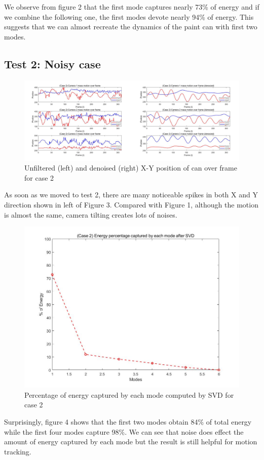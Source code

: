 \documentclass[11pt,a4paper]{article}
\numberwithin{equation}{subsection}
\begin{document}
We observe from figure 2 that the first mode captures nearly 73\% of energy and if we combine the following one, the first modes devote nearly 94\% of energy. This suggests that we can almost recreate the dynamics of the paint can with first two modes.

\subsection{Test 2: Noisy case}
\begin{figure}[H]
\begin{center}
\includegraphics[scale=0.20]{f3.jpg}
\caption{Unfiltered (left) and denoised (right) X-Y position of can over frame for case 2}
\end{center}
\end{figure}
As soon as we moved to test 2, there are many noticeable spikes in both X and Y direction shown in left of Figure 3. Compared with Figure 1, although the motion is almost the same, camera tilting creates lots of noises.
\begin{figure}[H]
\begin{center}
\includegraphics[scale=0.20]{f4.jpg}
\caption{Percentage of energy captured by each mode computed by SVD for case 2}
\end{center}
\end{figure}
Surprisingly, figure 4 shows that the first two modes obtain 84\% of total energy while the first four modes capture 98\%. We can see that noise does effect the amount of energy captured by each mode but the result is still helpful for motion tracking.
\end{document}
